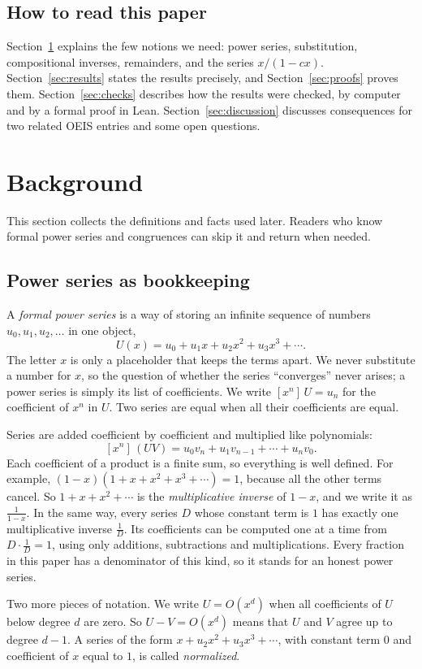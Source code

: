 \documentclass[11pt,a4paper]{article}
\theoremstyle{definition}
\theoremstyle{remark}
\newcommand{\coeff}[2]{[x^{#1}]\,#2}
\begin{document}
\subsection{How to read this paper}
Section~\ref{sec:background} explains the few notions we need: power series, substitution, compositional inverses,
remainders, and the series $x/(1-cx)$. Section~\ref{sec:results} states the results precisely, and
Section~\ref{sec:proofs} proves them. Section~\ref{sec:checks} describes how the results were checked, by computer and
by a formal proof in Lean. Section~\ref{sec:discussion} discusses consequences for two related OEIS entries and some
open questions.
\section{Background}\label{sec:background}
This section collects the definitions and facts used later. Readers who know formal power series and congruences can skip it and return when needed.
\subsection{Power series as bookkeeping}
A \emph{formal power series} is a way of storing an infinite sequence of numbers $u_0,u_1,u_2,\dots$ in one object,
\[
U(x)=u_0+u_1x+u_2x^2+u_3x^3+\cdots .
\]
The letter $x$ is only a placeholder that keeps the terms apart. We never substitute a number for $x$, so the question
of whether the series ``converges'' never arises; a power series is simply its list of coefficients. We write
$\coeff{n}{U}=u_n$ for the coefficient of $x^n$ in $U$. Two series are equal when all their coefficients are equal.

Series are added coefficient by coefficient and multiplied like polynomials:
\[
\coeff{n}{(UV)}=u_0v_n+u_1v_{n-1}+\cdots+u_nv_0 .
\]
Each coefficient of a product is a finite sum, so everything is well defined. For example,
$(1-x)(1+x+x^2+x^3+\cdots)=1$, because all the other terms cancel. So $1+x+x^2+\cdots$ is the
\emph{multiplicative inverse} of $1-x$, and we write it as $\frac{1}{1-x}$. In the same way, every series $D$ whose
constant term is $1$ has exactly one multiplicative inverse $\frac1D$. Its coefficients can be computed one at a time
from $D\cdot\frac1D=1$, using only additions, subtractions and multiplications. Every fraction in this paper has a
denominator of this kind, so it stands for an honest power series.

Two more pieces of notation. We write $U=O(x^d)$ when all coefficients of $U$ below degree $d$ are zero. So
$U-V=O(x^d)$ means that $U$ and $V$ agree up to degree $d-1$. A series of the form $x+u_2x^2+u_3x^3+\cdots$, with
constant term $0$ and coefficient of $x$ equal to $1$, is called \emph{normalized}.
\end{document}
